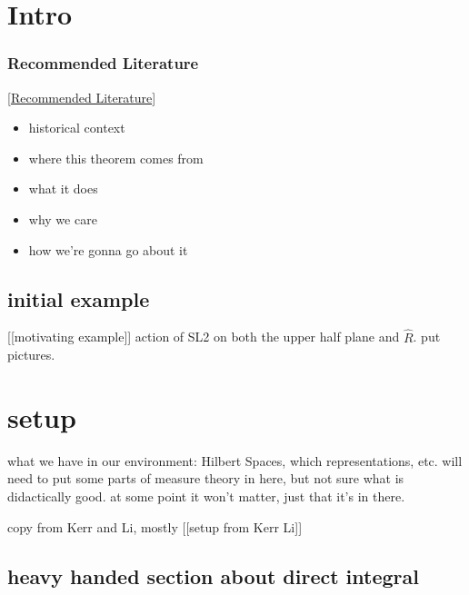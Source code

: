 \documentclass[
]{article}
\author{}
\date{}
\providecommand{\tightlist}{%
  \setlength{\itemsep}{0pt}\setlength{\parskip}{0pt}}
\begin{document}
\hypertarget{intro}{%
\section{Intro}\label{intro}}

\hypertarget{recommended-literature}{%
\subsubsection{Recommended Literature}\label{recommended-literature}}

{[}\protect\hyperlink{recommended-literature}{Recommended Literature}{]}

\begin{itemize}
\tightlist
\item
  historical context
\item
  where this theorem comes from
\item
  what it does
\item
  why we care
\item
  how we're gonna go about it
\end{itemize}

\hypertarget{initial-example}{%
\subsection{initial example}\label{initial-example}}

{[}{[}motivating example{]}{]} action of SL2 on both the upper half
plane and \(\hat{R}\). put pictures.

\hypertarget{setup}{%
\section{setup}\label{setup}}

what we have in our environment: Hilbert Spaces, which representations,
etc. will need to put some parts of measure theory in here, but not sure
what is didactically good. at some point it won't matter, just that it's
in there.

copy from Kerr and Li, mostly {[}{[}setup from Kerr Li{]}{]}

\hypertarget{heavy-handed-section-about-direct-integral}{%
\subsection{heavy handed section about direct
integral}\label{heavy-handed-section-about-direct-integral}}
\end{document}

